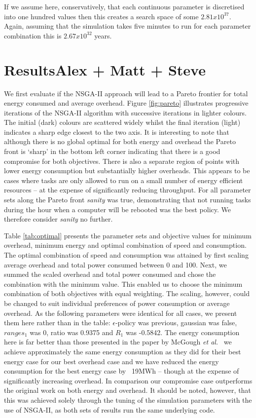 \documentclass[10pt, conference, compsocconf]{IEEEtran}
\begin{document}
If we assume here, conservatively, that each continuous parameter is discretised into one hundred values then this creates a search space of some $2.81 x 10^{37}$. Again, assuming that the simulation takes five minutes to run for each parameter combination this is $2.67 x 10^{32}$ years.

\section{Results{\color{red}Alex + Matt + Steve}}

We first evaluate if the NSGA-II approach will lead to a Pareto frontier for total energy consumed and average overhead. Figure \ref{fig:pareto} illustrates progressive iterations of the NSGA-II algorithm with successive iterations in lighter colours. The initial (dark) colours are scattered widely whilst the final iteration (light) indicates a sharp edge closest to the two axis. It is interesting to note that although there is no global optimal for both energy and overhead the Pareto front is `sharp' in the bottom left corner indicating that there is a good compromise for both objectives. There is also a separate region of points with lower energy consumption but substantially higher overheads. This appears to be cases where tasks are only allowed to run on a small number of energy efficient resources -- at the expense of significantly reducing throughput. For all parameter sets along the Pareto front {\em sanity} was true, demonstrating that not running tasks during the hour when a computer will be rebooted was the best policy. We therefore consider {\em sanity} no further.

Table \ref{tab:optimal} presents the parameter sets and objective values for minimum overhead, minimum energy and optimal combination of speed and consumption. The optimal combination of speed and consumption was attained by first scaling average overhead and total power consumed between 0 and 100. Next, we summed the scaled overhead and total power consumed and chose the combination with the minimum value. This enabled us to choose the minimum combination of both objectives with equal weighting. The scaling, however, could be changed to suit individual preferences of power consumption or average overhead. As the following parameters were identical for all cases, we present them here rather than in the table: $\epsilon$-policy was previous, gaussian was false, $ranges_1$ was 0, ratio was 0.9375 and $R_1$ was -0.5842. The energy consumption here is far better than those presented in the paper by McGough {\em et al.}~\cite{suscom} we achieve approximately the same energy consumption as they did for their best energy case for our best overhead case and we have reduced the energy consumption for the best energy case by ~19MWh -- though at the expense of significantly increasing overhead. In comparison our compromise case outperforms the original work on both energy and overhead. It should be noted, however, that this was achieved solely through the tuning of the simulation parameters with the use of NSGA-II, as both sets of results run the same underlying code.
\end{document}
